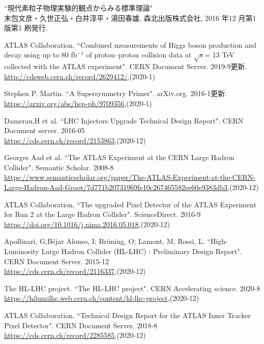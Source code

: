 \begin{thebibliography}{9}

``現代素粒子物理実験的観点からみる標準理論" \\
末包文彦・久世正弘・白井淳平・湯田春雄, 森北出版株式会社, 2016 年12 月第1 版第1 刷発行.

ATLAS Collaboration. ``Combined measurements of Higgs boson production and decay using up to 80 fb${}^{−1}$ of proton--proton collision data at $\sqrt{s}$= 13 TeV collected with the ATLAS experiment". CERN Document Server. 2019-9更新.\\
\url{http://cdsweb.cern.ch/record/2629412/},(2020-1)

Stephen P. Martin. ``A Supersymmetry Primer". arXiv.org. 2016-1更新.\\
\url{https://arxiv.org/abs/hep-ph/9709356},(2020-1)

Damerau,H et al. ``LHC Injectors Upgrade Technical Design Report". CERN Document server. 2016-05\\
\url{https://cds.cern.ch/record/2153863},(2020-12)

Georges Aad et al. ``The ATLAS Experiment at the CERN Large Hadron Collider". Semantic Scholar. 2008-8\\
\url{https://www.semanticscholar.org/paper/The-ATLAS-Experiment-at-the-CERN-Large-Hadron-Aad-Groot/7d771b20731969fe10c267465582ee60e9383db3},(2020-12)

ATLAS Collaboration. ``The upgraded Pixel Detector of the ATLAS Experiment for Run 2 at the Large Hadron Collider". ScienceDirect. 2016-9\\
\url{https://doi.org/10.1016/j.nima.2016.05.018},(2020-12)

Apollinari, G;Béjar Alonso, I; Brüning, O; Lamont, M; Rossi, L. ``High-Luminosity Large Hadron Collider (HL-LHC) : Preliminary Design Report". CERN Document Server. 2015-12\\
\url{https://cds.cern.ch/record/2116337},(2020-12)

The HL-LHC project. ``The HL-LHC project". CERN Accelerating science. 2020-8\\
\url{https://hilumilhc.web.cern.ch/content/hl-lhc-project},(2020-12)

ATLAS Collaboration. ``Technical Design Report for the ATLAS Inner Tracker Pixel Detector". CERN Document Server. 2018-8\\
\url{https://cds.cern.ch/record/2285585},(2020-12)


\end{thebibliography}
